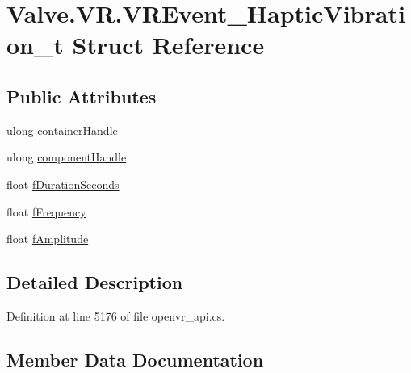 \hypertarget{struct_valve_1_1_v_r_1_1_v_r_event___haptic_vibration__t}{}\section{Valve.\+V\+R.\+V\+R\+Event\+\_\+\+Haptic\+Vibration\+\_\+t Struct Reference}
\label{struct_valve_1_1_v_r_1_1_v_r_event___haptic_vibration__t}
\subsection*{Public Attributes}
\begin{DoxyCompactItemize}
\item 
ulong \mbox{\hyperlink{struct_valve_1_1_v_r_1_1_v_r_event___haptic_vibration__t_a432384af9bfcccfd4b79ef49cf745dc8}{container\+Handle}}
\item 
ulong \mbox{\hyperlink{struct_valve_1_1_v_r_1_1_v_r_event___haptic_vibration__t_aaf2ebd669fd516fcb2b128fe99e5d595}{component\+Handle}}
\item 
float \mbox{\hyperlink{struct_valve_1_1_v_r_1_1_v_r_event___haptic_vibration__t_a1168bcc153ccd604a23fef7d92706aa5}{f\+Duration\+Seconds}}
\item 
float \mbox{\hyperlink{struct_valve_1_1_v_r_1_1_v_r_event___haptic_vibration__t_a181136abf12c1ce7a9179b12abc1974d}{f\+Frequency}}
\item 
float \mbox{\hyperlink{struct_valve_1_1_v_r_1_1_v_r_event___haptic_vibration__t_a69070ff99b35303551126586f9f3034c}{f\+Amplitude}}
\end{DoxyCompactItemize}


\subsection{Detailed Description}


Definition at line 5176 of file openvr\+\_\+api.\+cs.



\subsection{Member Data Documentation}
\mbox{\label{struct_valve_1_1_v_r_1_1_v_r_event___haptic_vibration__t_aaf2ebd669fd516fcb2b128fe99e5d595}} 
